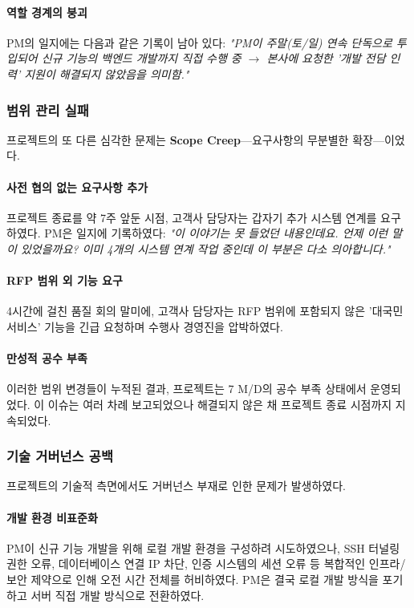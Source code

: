 \paragraph{역할 경계의 붕괴}
PM의 일지에는 다음과 같은 기록이 남아 있다: \textit{"PM이 주말(토/일) 연속 단독으로 투입되어 신규 기능의 백엔드 개발까지 직접 수행 중 $\rightarrow$ 본사에 요청한 '개발 전담 인력' 지원이 해결되지 않았음을 의미함."}

\subsubsection{범위 관리 실패}
프로젝트의 또 다른 심각한 문제는 \textbf{Scope Creep}---요구사항의 무분별한 확장---이었다.

\paragraph{사전 협의 없는 요구사항 추가}
프로젝트 종료를 약 7주 앞둔 시점, 고객사 담당자는 갑자기 추가 시스템 연계를 요구하였다. PM은 일지에 기록하였다: \textit{"이 이야기는 못 들었던 내용인데요. 언제 이런 말이 있었을까요? 이미 4개의 시스템 연계 작업 중인데 이 부분은 다소 의아합니다."}

\paragraph{RFP 범위 외 기능 요구}
4시간에 걸친 품질 회의 말미에, 고객사 담당자는 RFP 범위에 포함되지 않은 '대국민 서비스' 기능을 긴급 요청하며 수행사 경영진을 압박하였다.

\paragraph{만성적 공수 부족}
이러한 범위 변경들이 누적된 결과, 프로젝트는 7 M/D의 공수 부족 상태에서 운영되었다. 이 이슈는 여러 차례 보고되었으나 해결되지 않은 채 프로젝트 종료 시점까지 지속되었다.

\subsubsection{기술 거버넌스 공백}
프로젝트의 기술적 측면에서도 거버넌스 부재로 인한 문제가 발생하였다.

\paragraph{개발 환경 비표준화}
PM이 신규 기능 개발을 위해 로컬 개발 환경을 구성하려 시도하였으나, SSH 터널링 권한 오류, 데이터베이스 연결 IP 차단, 인증 시스템의 세션 오류 등 복합적인 인프라/보안 제약으로 인해 오전 시간 전체를 허비하였다. PM은 결국 로컬 개발 방식을 포기하고 서버 직접 개발 방식으로 전환하였다.

